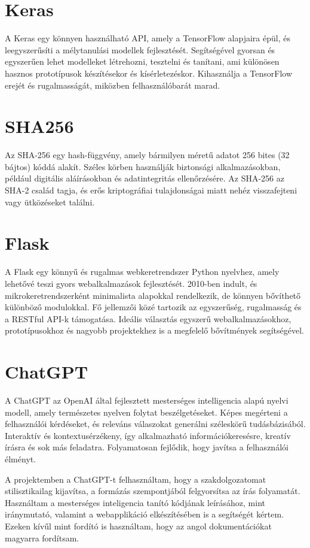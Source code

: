 \section{Keras}
A Keras egy könnyen használható API, amely a TensorFlow alapjaira épül, és leegyszerűsíti a mélytanulási modellek fejlesztését. Segítségével gyorsan és egyszerűen lehet modelleket létrehozni, tesztelni és tanítani, ami különösen hasznos prototípusok készítésekor és kísérletezéskor. Kihasználja a TensorFlow erejét és rugalmasságát, miközben felhasználóbarát marad.

\section{SHA256}
Az SHA-256 egy hash-függvény, amely bármilyen méretű adatot 256 bites (32 bájtos) kóddá alakít. Széles körben használják biztonsági alkalmazásokban, például digitális aláírásokban és adatintegritás ellenőrzésére. Az SHA-256 az SHA-2 család tagja, és erős kriptográfiai tulajdonságai miatt nehéz visszafejteni vagy ütközéseket találni.

\section{Flask}
A Flask egy könnyű és rugalmas webkeretrendszer Python nyelvhez, amely lehetővé teszi gyors webalkalmazások fejlesztését. 2010-ben indult, és mikrokeretrendszerként minimalista alapokkal rendelkezik, de könnyen bővíthető különböző modulokkal. Fő jellemzői közé tartozik az egyszerűség, rugalmasság és a RESTful API-k támogatása. Ideális választás egyszerű webalkalmazásokhoz, prototípusokhoz és nagyobb projektekhez is a megfelelő bővítmények segítségével.

\section{ChatGPT}
A ChatGPT az OpenAI által fejlesztett mesterséges intelligencia alapú nyelvi modell, amely természetes nyelven folytat beszélgetéseket. Képes megérteni a felhasználói kérdéseket, és releváns válaszokat generálni széleskörű tudásbázisából. Interaktív és kontextusérzékeny, így alkalmazható információkeresésre, kreatív írásra és sok más feladatra. Folyamatosan fejlődik, hogy javítsa a felhasználói élményt.

A projektemben a ChatGPT-t felhasználtam, hogy a szakdolgozatomat stilisztikailag kijavítsa, a formázás szempontjából felgyorsítsa az írás folyamatát. Használtam a mesterséges inteligencia tanító kódjának leírásához, mint iránymutató, valamint a webapplikáció elkészítésében is a segítségét kértem. Ezeken kívűl mint fordító is használtam, hogy az angol dokumentációkat magyarra fordítsam. 